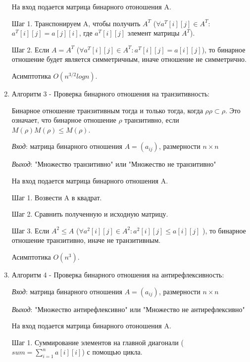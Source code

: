 \documentclass[spec, och, labwork]{shiza}
\begin{document}
\begin{enumerate}
                На вход подается матрица бинарного отоношения A. 

                Шаг 1. Транспонируем A, чтобы получить $A^T$ ($\forall a^T[i][j] \in A^T:$ $a^T[i][j] = a[j][i]$, где $a^T[i][j]$ элемент матрицы
                $A^T$).

                Шаг 2. Если $A = A^T$ ($\forall a^T[i][j] \in A^T: a^T[i][j] = a[i][j] $), то бинарное отношение будет является симметричным, иначе отношение не симметрично.

                Асимптотика $O(n^{3/2}logn)$.

                \item Алгоритм 3 - Проверка бинарного отношения на транзитивность:
                
                Бинарное отношение транзитивным тогда и только тогда, когда $\rho \rho \subset \rho$. Это означает, что бинарное
                отношение $\rho$ транзитивно, если $M(\rho)M(\rho) \leq M(\rho)$.
                
                \textit{Вход}: матрица бинарного отношения $A = (a_{ij})$, размерности $n \times n$

                \textit{Выход}: "Множество транзитивно" или "Множество не транзитивно"
                
                На вход подается матрица бинарного отношения A. 
                
                Шаг 1. Возвести A в квадрат.
                
                Шаг 2. Сравнить полученную и исходную матрицу.
                
                Шаг 3. Если $A^2 \leq A$ ($\forall a^2[i][j] \in A^2 : a^2[i][j] \leq a[i][j]$ ), то бинарное отношение транзитивно, иначе не транзитивным.

                Асимптотика $O(n^3)$.

                \item Алгоритм 4 - Проверка бинарного отношения на антирефлексивность:

                \textit{Вход}: матрица бинарного отношения $A = (a_{ij})$, размерности $n \times n$

                \textit{Выход}: "Множество антирефлексивно" или "Множество не антирефлексивно"
                
                На вход подается матрица бинарного отоношения A.

                Шаг 1. Суммирование элементов на главной диагонали ($sum = \sum\limits_{i=1}^n a[i][i]$) с помощью цикла. 
                

\end{enumerate}
\end{document}
